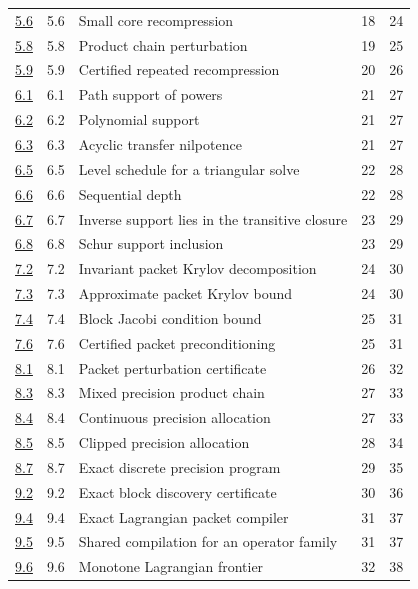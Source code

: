{\begin{longtable}{@{}p{.10\linewidth}p{.11\linewidth}p{.51\linewidth}rr@{}}
\hyperref[result:5.6]{5.6} & 5.6 & Small core recompression & 18 & 24\\
\hyperref[result:5.8]{5.8} & 5.8 & Product chain perturbation & 19 & 25\\
\hyperref[result:5.9]{5.9} & 5.9 & Certified repeated recompression & 20 & 26\\
\hyperref[result:6.1]{6.1} & 6.1 & Path support of powers & 21 & 27\\
\hyperref[result:6.2]{6.2} & 6.2 & Polynomial support & 21 & 27\\
\hyperref[result:6.3]{6.3} & 6.3 & Acyclic transfer nilpotence & 21 & 27\\
\hyperref[result:6.5]{6.5} & 6.5 & Level schedule for a triangular solve & 22 & 28\\
\hyperref[result:6.6]{6.6} & 6.6 & Sequential depth & 22 & 28\\
\hyperref[result:6.7]{6.7} & 6.7 & Inverse support lies in the transitive closure & 23 & 29\\
\hyperref[result:6.8]{6.8} & 6.8 & Schur support inclusion & 23 & 29\\
\hyperref[result:7.2]{7.2} & 7.2 & Invariant packet Krylov decomposition & 24 & 30\\
\hyperref[result:7.3]{7.3} & 7.3 & Approximate packet Krylov bound & 24 & 30\\
\hyperref[result:7.4]{7.4} & 7.4 & Block Jacobi condition bound & 25 & 31\\
\hyperref[result:7.6]{7.6} & 7.6 & Certified packet preconditioning & 25 & 31\\
\hyperref[result:8.1]{8.1} & 8.1 & Packet perturbation certificate & 26 & 32\\
\hyperref[result:8.3]{8.3} & 8.3 & Mixed precision product chain & 27 & 33\\
\hyperref[result:8.4]{8.4} & 8.4 & Continuous precision allocation & 27 & 33\\
\hyperref[result:8.5]{8.5} & 8.5 & Clipped precision allocation & 28 & 34\\
\hyperref[result:8.7]{8.7} & 8.7 & Exact discrete precision program & 29 & 35\\
\hyperref[result:9.2]{9.2} & 9.2 & Exact block discovery certificate & 30 & 36\\
\hyperref[result:9.4]{9.4} & 9.4 & Exact Lagrangian packet compiler & 31 & 37\\
\hyperref[result:9.5]{9.5} & 9.5 & Shared compilation for an operator family & 31 & 37\\
\hyperref[result:9.6]{9.6} & 9.6 & Monotone Lagrangian frontier & 32 & 38\\

\end{longtable}}
